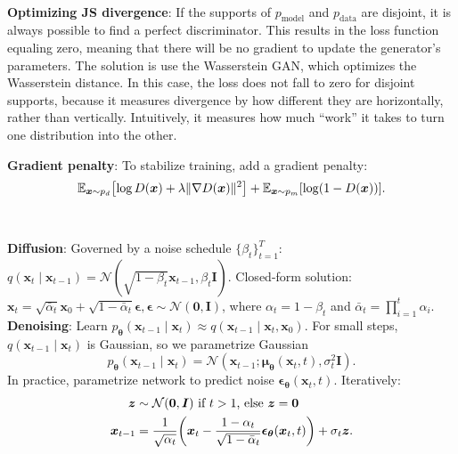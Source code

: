 \documentclass{article}
\newcommand{\lft}{\mathopen{}\mathclose\bgroup\left}
\newcommand{\rgt}{\aftergroup\egroup\right}
\newcommand{\E}{\mathbb{E}}
\renewcommand{\vec}[1]{\bm{#1}}
\newcommand{\mat}[1]{\bm{#1}}
\newenvironment{topic}[1]
{\textbf{\sffamily \colorbox{black}{\rlap{\textbf{\textcolor{white}{#1}}}\hspace{\linewidth}\hspace{-2\fboxsep}}} \\ \vspace{0.2cm}}
{}
\begin{document}
\begin{multicols*}{2}
\begin{topic}{Generative adversarial network}
        \textbf{Optimizing JS divergence}: If the supports of
        $p_{\mathrm{model}}$ and $p_{\mathrm{data}}$ are disjoint, it is always possible to find a
        perfect discriminator. This results in the loss function equaling zero, meaning that there
        will be no gradient to update the generator's parameters. The solution is use the Wasserstein
        GAN, which optimizes the Wasserstein distance. In this case, the loss does not fall to zero
        for disjoint supports, because it measures divergence by how different they are horizontally,
        rather than vertically. Intuitively, it measures how much “work” it takes to turn one
        distribution into the other.

        \textbf{Gradient penalty}: To stabilize training, add a gradient penalty: \[
            \E_{\vec{x} \sim p_d} \lft[ \log D(\vec{x}) + \lambda \| \nabla D(\vec{x}) \|^2 \rgt] + \E_{\vec{x} \sim p_m} [\log (1 - D(\vec{x}))].
        \]

    \end{topic}

    \begin{topic}{Diffusion models}

        \textbf{Diffusion}: Governed by a noise schedule $\{ \beta_t \}_{t=1}^T$: $q(\vec{x}_t \mid \vec{x}_{t-1}) = \mathcal{N}(\sqrt{1 - \beta_t} \vec{x}_{t-1}, \beta_t \mat{I})$.
        Closed-form solution: $\vec{x}_t = \sqrt{\bar{\alpha}_t} \vec{x}_0 + \sqrt{1 - \bar{\alpha}_t} \vec{\epsilon}, \vec{\epsilon} \sim \mathcal{N}(\vec{0}, \mat{I})$,
        where $\alpha_t = 1 - \beta_t$ and $\bar{\alpha}_t = \prod_{i=1}^t \alpha_i$. \\
        \textbf{Denoising}: Learn $p_{\vec{\theta}}(\vec{x}_{t-1} \mid \vec{x}_t) \approx
            q(\vec{x}_{t-1} \mid \vec{x}_t, \vec{x}_0)$. For small steps, $q(\vec{x}_{t-1} \mid \vec{x}_t)$
        is Gaussian, so we parametrize Gaussian \[
            p_{\vec{\theta}}(\vec{x}_{t-1} \mid \vec{x}_t) = \mathcal{N}(\vec{x}_{t-1} ; \vec{\mu}_{\vec{\theta}}(\vec{x}_t, t), \sigma_t^2 \mat{I}).
        \]
        In practice, parametrize network to predict noise $\vec{\epsilon}_{\vec{\theta}}(\vec{x}_t, t)$.
        Iteratively:
        \begin{align*}
            \vec{z}       & \sim \mathcal{N}(\vec{0}, \mat{I}) \text{ if $t > 1$, else $\vec{z} = \vec{0}$}                                                                                    \\
            \vec{x}_{t-1} & = \frac{1}{\sqrt{\alpha_t}} \lft( \vec{x}_t - \frac{1 - \alpha_t}{\sqrt{1 - \bar{\alpha}_t}} \vec{\epsilon}_{\vec{\theta}}(\vec{x}_t, t) \rgt) + \sigma_t \vec{z}.
        \end{align*}


\end{topic}
\end{multicols*}
\end{document}
